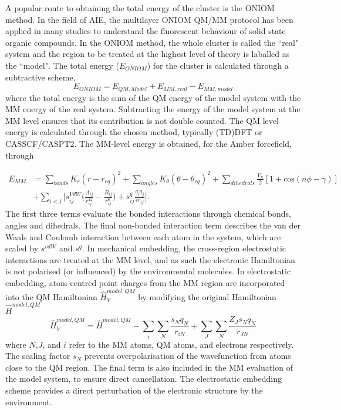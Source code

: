 A popular route to obtaining the total energy of the cluster is the ONIOM method.\cite{Byun1999,Frisch2003,Chung2015a} In the field of \ac{AIE}, the multilayer ONIOM QM/MM protocol has been applied in many studies to understand the fluorescent behaviour of solid state organic compounds.\cite{Li2011,Li2013,Sun2015a,Presti2016a,Wilbraham2016,Wang2016,Peng2016,Fan2016,Presti2017a,Li2017b,Lin2017,Li2017e,Fan2017,Hestand2017} In the ONIOM method, the whole cluster is called the ``real" system and the region to be treated at the highest level of theory is laballed as the ``model". The total energy ($E_{ONIOM}$) for the cluster is calculated through a subtractive scheme,
\begin{equation}\label{equation: ONIOM}
E_{ONIOM}=E_{QM,Model}+E_{MM,real}-E_{MM,model}
\end{equation}
where the total energy is the sum of the QM energy of the model system with the MM energy of the real system. Subtracting the energy of the model system at the MM level ensures that its contribution is not double counted.\cite{Chung2015a} The QM level energy is calculated through the chosen method, typically (TD)DFT or CASSCF/CASPT2. The MM-level energy is obtained, for the Amber forcefield, through

\begin{equation}
\begin{split}
    E_{MM}&=\sum_{bonds}K_{r}(r-r_{eq})^{2}+\sum_{angles}K_{\theta}(\theta-\theta_{eq})^{2}+\sum_{dihedrals}\frac{V_{n}}{2}[1+\mathrm{cos}(n\phi{}-\gamma{})]\\
    &+\sum_{i<j}\bigg[s_{ij}^{VdW}\big(\frac{A_{ij}}{r_{ij}^{12}}-\frac{B_{ij}}{r_{ij}^{6}}\big)+s^{q}_{ij}\frac{q_{i}q_{j}}{\epsilon{}r_{ij}}\bigg].
\end{split}
\end{equation}
The first three terms evaluate the bonded interactions through chemical bonds, angles and dihedrals. The final non-bonded interaction term describes the van der Waals and Coulomb interaction between each atom in the system, which are scaled by $s^{vdW}$ and $s^{q}$.
In mechanical embedding, the cross-region electrostatic interactions are treated at the MM level, and as such the electronic Hamiltonian is not polarised (or influenced) by the environmental molecules. In electrostatic embedding, atom-centred point charges from the MM region are incorporated into the QM Hamiltonian $\hat{H}_{V}^{model,QM}$ by modifying the original Hamiltonian $\hat{H}^{model,QM}$
\begin{equation}
    \hat{H}_{V}^{model,QM}=\hat{H}^{model,QM}-\sum_{i}\sum_{N}\frac{s_{N}q_{N}}{r_{iN}}+\sum_{J}\sum_{N}\frac{Z_{J}s_{N}q_{N}}{r_{JN}}
\end{equation}
where $N$,$J$, and $i$ refer to the MM atoms, QM atoms, and electrons respectively.\cite{Vreven2006} The scaling factor $s_{N}$ prevents overpolarisation of the wavefunction from atoms close to the QM region. The final term is also included in the MM evaluation of the model system, to ensure direct cancellation. The electrostatic embedding scheme provides a direct perturbation of the electronic structure by the environment. 

